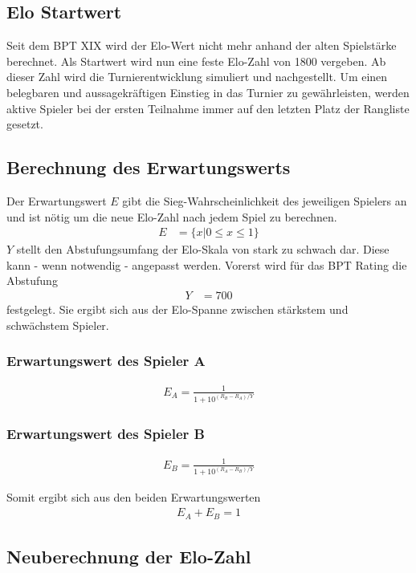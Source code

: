 \documentclass[a4paper, 12pt]{article}
\begin{document}
\subsection{Elo Startwert}
Seit dem BPT XIX wird der Elo-Wert nicht mehr anhand der alten Spielstärke berechnet. Als Startwert wird nun eine feste Elo-Zahl von 1800 vergeben. Ab dieser Zahl wird die Turnierentwicklung simuliert und nachgestellt.
Um einen belegbaren und aussagekräftigen Einstieg in das Turnier zu gewährleisten, werden aktive Spieler bei der ersten Teilnahme immer auf den letzten Platz der Rangliste gesetzt.
\subsection{Berechnung des Erwartungswerts}
Der Erwartungswert \(E\) gibt die Sieg-Wahrscheinlichkeit des jeweiligen Spielers an und ist nötig um die neue Elo-Zahl nach jedem Spiel zu berechnen.
\begin{align}
E&=\{x|0 \leq x \leq 1\}
\end{align}
\(Y\) stellt den Abstufungsumfang der Elo-Skala von stark zu schwach dar. Diese kann - wenn notwendig - angepasst werden. Vorerst wird für das BPT Rating die Abstufung
\begin{align}
Y&=700
\end{align}
festgelegt. Sie ergibt sich aus der Elo-Spanne zwischen stärkstem und schwächstem Spieler.

\subsubsection{Erwartungswert des Spieler A}
\begin{align}
E_{A} = \frac{1}{1+10^{(R_{B}-R_{A})/Y}}
\end{align}

\subsubsection{Erwartungswert des Spieler B}
\begin{align}
E_{B} = \frac{1}{1+10^{(R_{A}-R_{B})/Y}}
\end{align}

Somit ergibt sich aus den beiden Erwartungswerten
\begin{align}
E_A + E_B = 1
\end{align}

\subsection{Neuberechnung der Elo-Zahl}
\end{document}
